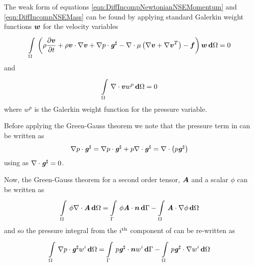 The weak form of equations \ref{eqn:DiffIncompNewtonianNSEMomentum} and
\ref{eqn:DiffIncompNSEMass} can be found by applying standard Galerkin weight
functions $\boldsymbol{w}$ for the velocity variables \ie
\begin{equation}
  \gint{\Omega}{}{\pbrac{\rho\delby{\vectr{v}}{t}+\dotprod{\rho\vectr{v}}{\gradient{}{\vectr{v}}}
      +\dotprod{\gradient{}{p}}{\sharptensor{\tensor{g}}}
      -\divergence{}{\mu\pbrac{\gradient{}{\vectr{v}+\transpose{\gradient{}{\vectr{v}}}}}}
      -\vectr{f}}{\vectr{w}}}{\Omega} = 0
 \label{eqn:BasicGalerkinNSEMomentum}
\end{equation}
and
\begin{equation}
  \gint{\Omega}{}{\divergence{}{\vectr{v}}w^{p}}{\Omega} = 0
 \label{eqn:BasicGalerkinNSEMass}
\end{equation}
where $w^{p}$ is the Galerkin weight function for the pressure variable.

Before applying the Green-Gauss theorem we note that the pressure term in
 can be written as
\begin{equation}
  \dotprod{\gradient{}{p}}{\sharptensor{\tensor{g}}}=\dotprod{\gradient{}{p}}{\sharptensor{\tensor{g}}}+p\divergence{}{\sharptensor{\tensor{g}}}=\divergence{}{\pbrac{p\sharptensor{\tensor{g}}}}
\end{equation}
using  as
$\divergence{}{\sharptensor{\tensor{g}}}=0$.

Now, the Green-Gauss theorem for a second order tensor, $\boldsymbol{A}$ and a
scalar $\phi$ can be written as
\begin{equation}
  \gint{\Omega}{}{\phi\divergence{}{\tensor{A}}}{\Omega}=\gint{\Gamma}{}{\dotprod{\phi\tensor{A}}{\vectr{n}}}{\Gamma}-\gint{\Omega}{}{\dotprod{\tensor{A}}{\gradient{}{\phi}}}{\Omega}
\end{equation}
and so the pressure integral from the ${i}^{\text{th}}$ component of
 can be re-written as
\begin{equation}
  \gint{\Omega}{}{\dotprod{\gradient{}{p}}{\sharptensor{\tensor{g}}}w^{i}}{\Omega}=\gint{\Gamma}{}{\dotprod{p\sharptensor{\tensor{g}}}{\vectr{n}}w^{i}}{\Gamma}-\gint{\Omega}{}{\dotprod{p\sharptensor{\tensor{g}}}{\gradient{}{w^{i}}}}{\Omega}
\end{equation}

